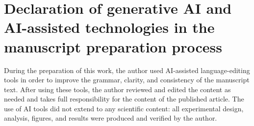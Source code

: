 \documentclass[review,12pt,number]{elsarticle}
\begin{document}
\section*{Declaration of generative AI and AI-assisted
technologies in the manuscript preparation process}
During the preparation of this work, the author used AI-assisted
language-editing tools in order to improve the grammar, clarity, and
consistency of the manuscript text. After using these tools, the
author reviewed and edited the content as needed and takes full
responsibility for the content of the published article. The use of
AI tools did not extend to any scientific content: all experimental
design, analysis, figures, and results were produced and verified by
the author.



\end{document}
